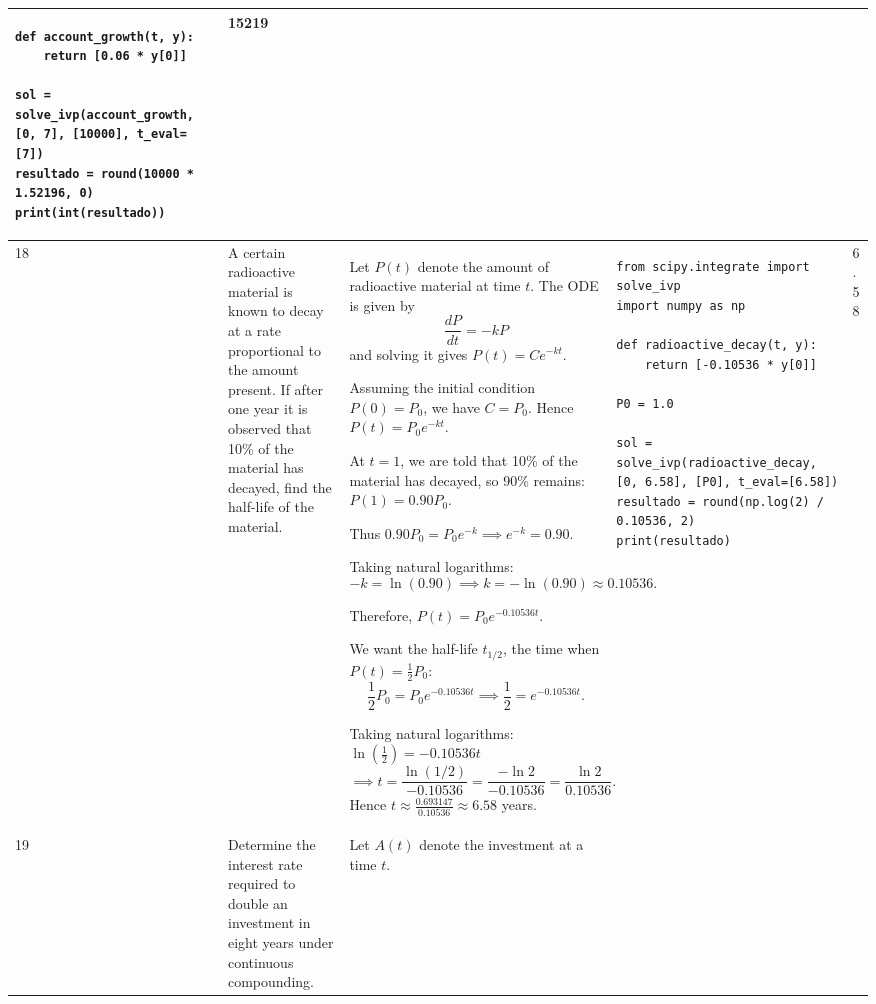 \documentclass[a4paper,12pt]{article}
\begin{document}
\begin{longtable}{|p{0.3cm}|p{}|p{10cm}|p{}|p{1.5cm}|}
\begin{verbatim}
def account_growth(t, y):
    return [0.06 * y[0]]

sol = solve_ivp(account_growth, [0, 7], [10000], t_eval=[7])
resultado = round(10000 * 1.52196, 0)
print(int(resultado))\end{verbatim}&   15219             \\ \hline
    18            &  A certain radioactive material is known to decay at a rate proportional to the amount present. If after one year it is observed that 10\% of the material has decayed, find the half-life of the material.
                &  
Let \( P(t) \) denote the amount of radioactive material at time \( t \). The ODE is given by
\[
\frac{dP}{dt} = -kP
\]
and solving it gives $P(t) = C e^{-kt}.$


Assuming the initial condition \( P(0) = P_0 \), we have \( C = P_0 \). Hence
$P(t) = P_0 e^{-kt}.$

At \( t = 1 \), we are told that 10\% of the material has decayed, so 90\% remains:$P(1) = 0.90 P_0.$

Thus $0.90 P_0 = P_0 e^{-k} \implies e^{-k} = 0.90.$

Taking natural logarithms:
\[
-k = \ln(0.90) \implies k = -\ln(0.90) \approx 0.10536.
\]

Therefore, $P(t) = P_0 e^{-0.10536t}.$

We want the half-life \( t_{1/2} \), the time when \( P(t) = \frac{1}{2}P_0 \):
\[
\frac{1}{2} P_0 = P_0 e^{-0.10536t} \implies \frac{1}{2} = e^{-0.10536t}.
\]

Taking natural logarithms:
$
\ln\left(\frac{1}{2}\right) = -0.10536t$ 
\[\implies t = \frac{\ln(1/2)}{-0.10536} = \frac{-\ln 2}{-0.10536} = \frac{\ln 2}{0.10536}.
\]
Hence $t \approx \frac{0.693147}{0.10536} \approx 6.58$  years.


            & \begin{verbatim}
from scipy.integrate import solve_ivp
import numpy as np

def radioactive_decay(t, y):
    return [-0.10536 * y[0]]

P0 = 1.0

sol = solve_ivp(radioactive_decay, [0, 6.58], [P0], t_eval=[6.58])
resultado = round(np.log(2) / 0.10536, 2)
print(resultado)\end{verbatim}&   6.58               \\ \hline
    19             & Determine the interest rate required to double an investment in eight years under continuous compounding.               & Let \( A(t) \) denote the investment at a time \( t \).


\end{longtable}
\end{document}
